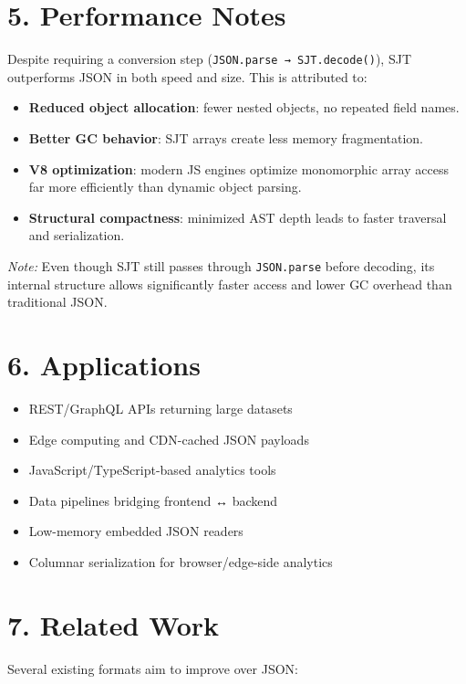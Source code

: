 \documentclass[12pt]{article}
\begin{document}
\section*{5. Performance Notes}

Despite requiring a conversion step (\texttt{JSON.parse → SJT.decode()}), SJT outperforms JSON in both speed and size. This is attributed to:

\begin{itemize}
  \item \textbf{Reduced object allocation}: fewer nested objects, no repeated field names.
  \item \textbf{Better GC behavior}: SJT arrays create less memory fragmentation.
  \item \textbf{V8 optimization}: modern JS engines optimize monomorphic array access far more efficiently than dynamic object parsing.
  \item \textbf{Structural compactness}: minimized AST depth leads to faster traversal and serialization.
\end{itemize}

\textit{Note:} Even though SJT still passes through \texttt{JSON.parse} before decoding, its internal structure allows significantly faster access and lower GC overhead than traditional JSON.

\section*{6. Applications}

\begin{itemize}
  \item REST/GraphQL APIs returning large datasets
  \item Edge computing and CDN-cached JSON payloads
  \item JavaScript/TypeScript-based analytics tools
  \item Data pipelines bridging frontend ↔ backend
  \item Low-memory embedded JSON readers
  \item Columnar serialization for browser/edge-side analytics
\end{itemize}

\section*{7. Related Work}

Several existing formats aim to improve over JSON:
\end{document}
